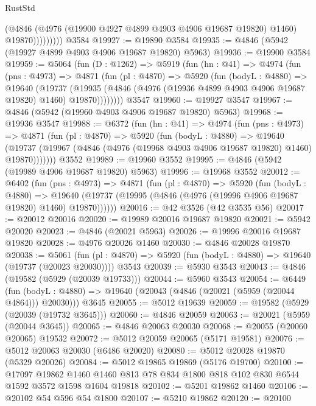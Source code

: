 \begin{lexlean}{RustStd}
\begin{coremodule}
                    (@4846
                      (@4976 (@19900 @4927 @4899 @4903 @4906 @19687 @19820) @1460)
                      @19870)))))))))
    @3584
@19927 := @19890 @3584
@19935 := @4846 (@5942 (@19927 @4899 @4903 @4906 @19687 @19820) @5963)
@19936 := @19900 @3584
@19959 := @5064
    (fun (D : @1262) =>
    @5919
      (fun (hn : @41) =>
      @4974
        (fun (pns : @4973) =>
        @4871
          (fun (pl : @4870) =>
          @5920
            (fun (bodyL : @4880) =>
            @19640
              (@19737
                (@19935 (@4846 (@4976 (@19936 @4899 @4903 @4906 @19687 @19820) @1460) @19870))))))))
    @3547
@19960 := @19927 @3547
@19967 := @4846 (@5942 (@19960 @4903 @4906 @19687 @19820) @5963)
@19968 := @19936 @3547
@19988 := @6372
    (fun (hn : @41) =>
    @4974
      (fun (pns : @4973) =>
      @4871
        (fun (pl : @4870) =>
        @5920
          (fun (bodyL : @4880) =>
          @19640
            (@19737 (@19967 (@4846 (@4976 (@19968 @4903 @4906 @19687 @19820) @1460) @19870)))))))
    @3552
@19989 := @19960 @3552
@19995 := @4846 (@5942 (@19989 @4906 @19687 @19820) @5963)
@19996 := @19968 @3552
@20012 := @6402
    (fun (pns : @4973) =>
    @4871
      (fun (pl : @4870) =>
      @5920
        (fun (bodyL : @4880) =>
        @19640 (@19737 (@19995 (@4846 (@4976 (@19996 @4906 @19687 @19820) @1460) @19870))))))
@20016 := @42 @3526 (@42 @3535 @56)
@20017 := @20012 @20016
@20020 := @19989 @20016 @19687 @19820
@20021 := @5942 @20020
@20023 := @4846 (@20021 @5963)
@20026 := @19996 @20016 @19687 @19820
@20028 := @4976 @20026 @1460
@20030 := @4846 @20028 @19870
@20038 := @5061
    (fun (pl : @4870) => @5920 (fun (bodyL : @4880) => @19640 (@19737 (@20023 @20030))))
    @3543
@20039 := @5930 @3543
@20043 := @4846 (@19582 (@5929 (@20039 @19733)))
@20044 := @5960 @3543
@20054 := @6449
    (fun (bodyL : @4880) => @19640 (@20043 (@4846 (@20021 (@5959 (@20044 @4864))) @20030)))
    @3645
@20055 := @5012 @19639
@20059 := @19582 (@5929 (@20039 (@19732 @3645)))
@20060 := @4846 @20059
@20063 := @20021 (@5959 (@20044 @3645))
@20065 := @4846 @20063 @20030
@20068 := @20055 (@20060 @20065) @19532
@20072 := @5012 @20059 @20065 (@5171 @19581)
@20076 := @5012 @20063 @20030 (@6486 @20020)
@20080 := @5012 @20028 @19870 (@5329 @20026)
@20084 := @5012 @19865 @19869 (@5176 @19700)
@20100 := @17097
    @19862
    @1460
    @1460
    @813
    @78
    @834
    @1800
    @818
    @102
    @830
    @6544
    @1592
    @3572
    @1598
    @1604
    @19818
@20102 := @5201 @19862 @1460
@20106 := @20102 @54 @596 @54 @1800
@20107 := @5210 @19862
@20120 := @20100

\end{coremodule}
\end{lexlean}
